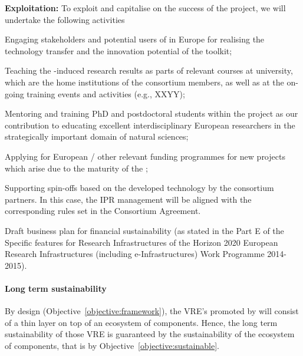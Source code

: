 
{\bf Exploitation:} To exploit and capitalise on the success of the project, we will undertake the following activities
\begin{compactenum}
\item Engaging stakeholders and potential users of \TheProject in Europe for realising the technology transfer and the innovation potential of the toolkit;
\item Teaching the \TheProject-induced research results as parts of relevant courses at university, which are the home institutions of the consortium members, as well as at the on-going training events and activities (e.g., XXYY);
\item Mentoring and training PhD and postdoctoral students within the project as our contribution to educating excellent interdisciplinary European researchers in the strategically important domain of natural sciences;
\item Applying for European / other relevant funding programmes for new projects which arise due to the maturity of the \TheProject;
\item Supporting spin-offs based on the developed technology by the consortium partners. In this case, the IPR management will be aligned with the corresponding rules set in the Consortium Agreement.
\end{compactenum}


Draft business plan for financial sustainability (as stated in the Part
E of the Specific features for Research Infrastructures of the Horizon
2020 European Research Infrastructures (including e-Infrastructures)
Work Programme 2014-2015).

\paragraph{Long term sustainability}

By design (Objective~\ref{objective:framework}), the VRE's promoted by
\TheProject will consist of a thin layer on top of an ecosystem of
components. Hence, the long term sustainability of those VRE is
guaranteed by the sustainability of the ecosystem of components, that
is by Objective~\ref{objective:sustainable}.

